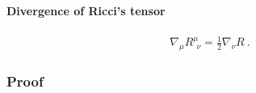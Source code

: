 \documentclass[letterpaper,10pt,english]{jupyterBook}
\begin{document}
\paragraph{Divergence of Ricci’s tensor}
\label{\detokenize{ch/relativity-general/differential-geometry:divergence-of-ricci-s-tensor}}\label{\detokenize{ch/relativity-general/differential-geometry:relativity-general-notes-differential-geometry-curvature-tensor-properties-ricci-divergence}}\begin{equation*}
\begin{split}
  \nabla_{\mu} R^{\mu}_{\ \ \nu} = \frac{1}{2} \nabla_{\nu} R \ .
\end{split}
\end{equation*}\subsubsection*{Proof}

\sphinxAtStartPar
{}



\sphinxstepscope
\end{document}
